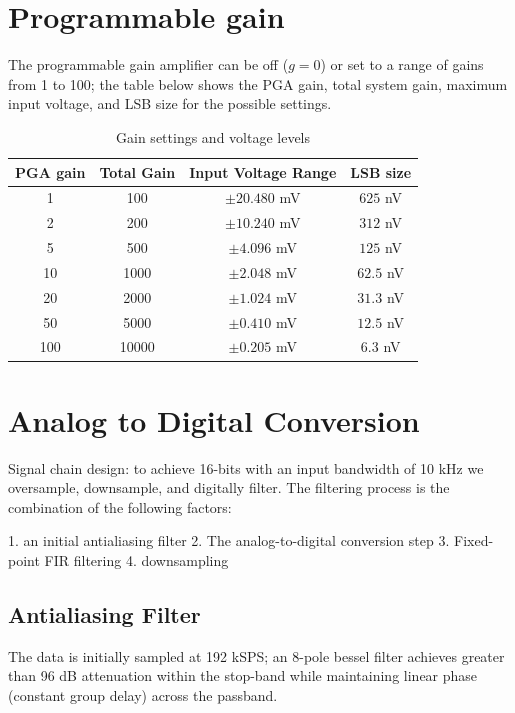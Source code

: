 \section{Programmable gain}
The programmable gain amplifier can be off ($g=0$) or set to a range of gains from 1 to 100; the table below shows the PGA gain, total system gain, maximum input voltage, and LSB size for the possible settings. 

\begin{table}
\begin{centering}
\begin{tabular}[h!]{|c|c|c|c|}
\hline
PGA gain & Total Gain & Input Voltage Range & LSB size \\
\hline
1 & 100 & $\pm20.480$ mV & $625$ nV \\
2 & 200 & $\pm10.240$ mV & $312$ nV \\
5 & 500 & $\pm4.096$ mV & $125$ nV \\
10 & 1000 & $\pm2.048$ mV & $62.5$ nV \\
20 & 2000 & $\pm1.024$ mV & $31.3$ nV \\
50 & 5000 & $\pm0.410$ mV & $12.5$ nV \\
100 & 10000 & $\pm0.205$ mV & $6.3$ nV \\
\hline
\end{tabular}
\end{centering}
\caption{Gain settings and voltage levels}
\end{table}

\section{Analog to Digital Conversion}
Signal chain design: 
to achieve 16-bits with an input bandwidth of 10 kHz we oversample, downsample, and digitally filter. The filtering process is the combination of the following factors:

1. an initial antialiasing filter
2. The analog-to-digital conversion step
3. Fixed-point FIR filtering
4. downsampling



\subsection{Antialiasing Filter}
The data is initially sampled at 192 kSPS; an 8-pole bessel filter achieves greater than 96 dB attenuation within the stop-band while maintaining linear phase (constant group delay) across the passband.

